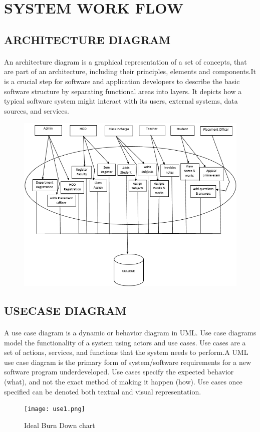 \documentclass[a4paper, 12pt]{report}
\begin{document}
\section{SYSTEM WORK FLOW}
\subsection{ARCHITECTURE DIAGRAM}
\paragraph{}An architecture diagram is a graphical representation of a set of concepts, that are part of an architecture, including their principles, elements and components.It is a crucial step for software and application developers to describe the basic software structure by separating functional areas into layers. It depicts how a typical software system might interact with its users, external systems, data sources, and services.
\begin{figure}[ht]
	\centering
	\includegraphics[width=0.5\linewidth]{Architectural}
	\label{}
\end{figure}
\newpage
\subsection{USECASE DIAGRAM}
\paragraph{}A use case diagram is a dynamic or behavior diagram in UML. Use case diagrams model the functionality of a system using actors and use cases. Use cases are a set of actions, services, and functions that the system needs to perform.A UML use case diagram is the primary form of system/software requirements for a new software program underdeveloped. Use cases specify the expected behavior (what), and not the exact method of making it happen (how). Use cases once specified can be denoted both textual and visual representation.
\begin{figure}[!htb]
\begin{center}
	\texttt{[image: use1.png]}
	\caption{Ideal Burn Down chart}
\end{center}
\end{figure}
\end{document}
